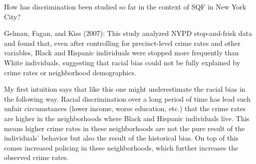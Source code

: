 How has discrimination been studied so far in the context of SQF in New York City?

Gelman, Fagan, and Kiss (2007): This study analyzed NYPD stop-and-frisk data and found that,
even after controlling for precinct-level crime rates and other variables, Black and Hispanic
individuals were stopped more frequently than White individuals, suggesting that racial bias
could not be fully explained by crime rates or neighborhood demographics.

My first intuition says that like this one might underestimate the racial bias in the following way.
Racial discrimination over a long period of time has lead such unfair circumstances
(lower income, worse education, etc.) that the crime rates are higher in the neighborhoods
where Black and Hispanic individuals live. This means higher crime rates in these neighborhoods
are not the pure result of the individuals' behavior but also the result of the historical bias.
On top of this comes increased policing in these neighborhoods, which further increases the observed
crime rates. 